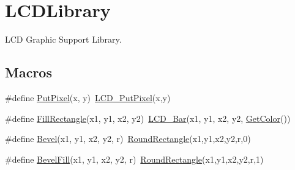 \hypertarget{group___l_c_d_library}{}\section{L\+C\+D\+Library}
\label{group___l_c_d_library}


L\+C\+D Graphic Support Library.  


\subsection*{Macros}
\begin{DoxyCompactItemize}
\item 
\#define \hyperlink{group___l_c_d_library_gaff527cc0d939f5b1fe4573915b27b5ca}{Put\+Pixel}(x,  y)~\hyperlink{group___s_s_d1289_ga1e7159fb1589ae14a93d4b8e5503a571}{L\+C\+D\+\_\+\+Put\+Pixel}(x,y)
\item 
\#define \hyperlink{group___l_c_d_library_ga699fc5286b5921b6037f1be9d2c3cf72}{Fill\+Rectangle}(x1,  y1,  x2,  y2)~\hyperlink{group___s_s_d1289_ga69b45f8c8ad7e99e27138691149cd1f9}{L\+C\+D\+\_\+\+Bar}(x1, y1, x2, y2, \hyperlink{group___s_s_d1289_ga0eb009d359fe9f8ec383fd9fa31f7c33}{Get\+Color}())
\item 
\#define \hyperlink{group___l_c_d_library_ga48e88028ef3176fab6f4ac3439c3f2f0}{Bevel}(x1,  y1,  x2,  y2,  r)~\hyperlink{group___l_c_d_library_ga9584a175765628382707bdc8397c0e2b}{Round\+Rectangle}(x1,y1,x2,y2,r,0)
\item 
\#define \hyperlink{group___l_c_d_library_ga3012a22ab5045f42d5a50e783f363749}{Bevel\+Fill}(x1,  y1,  x2,  y2,  r)~\hyperlink{group___l_c_d_library_ga9584a175765628382707bdc8397c0e2b}{Round\+Rectangle}(x1,y1,x2,y2,r,1)
\end{DoxyCompactItemize}
